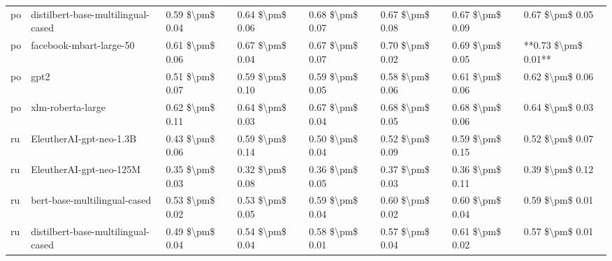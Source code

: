 \begin{tabular}{llllllll}
      po & distilbert-base-multilingual-cased & 0.59 \$\textbackslash pm\$ 0.04 &           0.64 \$\textbackslash pm\$ 0.06 &       0.68 \$\textbackslash pm\$ 0.07 &        0.67 \$\textbackslash pm\$ 0.08 &                         0.67 \$\textbackslash pm\$ 0.09 &     0.67 \$\textbackslash pm\$ 0.05 \\
      po &            facebook-mbart-large-50 & 0.61 \$\textbackslash pm\$ 0.06 &           0.67 \$\textbackslash pm\$ 0.04 &       0.67 \$\textbackslash pm\$ 0.07 &        0.70 \$\textbackslash pm\$ 0.02 &                         0.69 \$\textbackslash pm\$ 0.05 & **0.73 \$\textbackslash pm\$ 0.01** \\
      po &                               gpt2 & 0.51 \$\textbackslash pm\$ 0.07 &           0.59 \$\textbackslash pm\$ 0.10 &       0.59 \$\textbackslash pm\$ 0.05 &        0.58 \$\textbackslash pm\$ 0.06 &                         0.61 \$\textbackslash pm\$ 0.06 &     0.62 \$\textbackslash pm\$ 0.06 \\
      po &                  xlm-roberta-large & 0.62 \$\textbackslash pm\$ 0.11 &           0.64 \$\textbackslash pm\$ 0.03 &       0.67 \$\textbackslash pm\$ 0.04 &        0.68 \$\textbackslash pm\$ 0.05 &                         0.68 \$\textbackslash pm\$ 0.06 &     0.64 \$\textbackslash pm\$ 0.03 \\
      ru &            EleutherAI-gpt-neo-1.3B & 0.43 \$\textbackslash pm\$ 0.06 &           0.59 \$\textbackslash pm\$ 0.14 &       0.50 \$\textbackslash pm\$ 0.04 &        0.52 \$\textbackslash pm\$ 0.09 &                         0.59 \$\textbackslash pm\$ 0.15 &     0.52 \$\textbackslash pm\$ 0.07 \\
      ru &            EleutherAI-gpt-neo-125M & 0.35 \$\textbackslash pm\$ 0.03 &           0.32 \$\textbackslash pm\$ 0.08 &       0.36 \$\textbackslash pm\$ 0.05 &        0.37 \$\textbackslash pm\$ 0.03 &                         0.36 \$\textbackslash pm\$ 0.11 &     0.39 \$\textbackslash pm\$ 0.12 \\
      ru &       bert-base-multilingual-cased & 0.53 \$\textbackslash pm\$ 0.02 &           0.53 \$\textbackslash pm\$ 0.05 &       0.59 \$\textbackslash pm\$ 0.04 &        0.60 \$\textbackslash pm\$ 0.02 &                         0.60 \$\textbackslash pm\$ 0.04 &     0.59 \$\textbackslash pm\$ 0.01 \\
      ru & distilbert-base-multilingual-cased & 0.49 \$\textbackslash pm\$ 0.04 &           0.54 \$\textbackslash pm\$ 0.04 &       0.58 \$\textbackslash pm\$ 0.01 &        0.57 \$\textbackslash pm\$ 0.04 &                         0.61 \$\textbackslash pm\$ 0.02 &     0.57 \$\textbackslash pm\$ 0.01 \\

\end{tabular}
